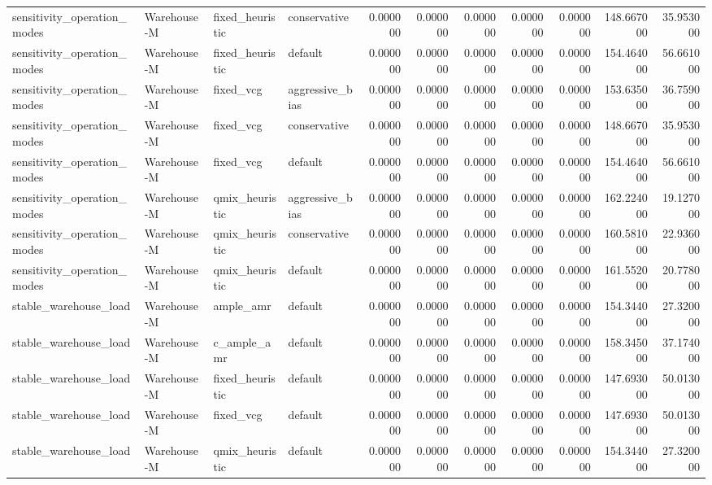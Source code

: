 \begin{tabular}{llllrrrrrrr}
sensitivity_operation_modes & Warehouse-M & fixed_heuristic & conservative & 0.000000 & 0.000000 & 0.000000 & 0.000000 & 0.000000 & 148.667000 & 35.953000 \\
sensitivity_operation_modes & Warehouse-M & fixed_heuristic & default & 0.000000 & 0.000000 & 0.000000 & 0.000000 & 0.000000 & 154.464000 & 56.661000 \\
sensitivity_operation_modes & Warehouse-M & fixed_vcg & aggressive_bias & 0.000000 & 0.000000 & 0.000000 & 0.000000 & 0.000000 & 153.635000 & 36.759000 \\
sensitivity_operation_modes & Warehouse-M & fixed_vcg & conservative & 0.000000 & 0.000000 & 0.000000 & 0.000000 & 0.000000 & 148.667000 & 35.953000 \\
sensitivity_operation_modes & Warehouse-M & fixed_vcg & default & 0.000000 & 0.000000 & 0.000000 & 0.000000 & 0.000000 & 154.464000 & 56.661000 \\
sensitivity_operation_modes & Warehouse-M & qmix_heuristic & aggressive_bias & 0.000000 & 0.000000 & 0.000000 & 0.000000 & 0.000000 & 162.224000 & 19.127000 \\
sensitivity_operation_modes & Warehouse-M & qmix_heuristic & conservative & 0.000000 & 0.000000 & 0.000000 & 0.000000 & 0.000000 & 160.581000 & 22.936000 \\
sensitivity_operation_modes & Warehouse-M & qmix_heuristic & default & 0.000000 & 0.000000 & 0.000000 & 0.000000 & 0.000000 & 161.552000 & 20.778000 \\
stable_warehouse_load & Warehouse-M & ample_amr & default & 0.000000 & 0.000000 & 0.000000 & 0.000000 & 0.000000 & 154.344000 & 27.320000 \\
stable_warehouse_load & Warehouse-M & c_ample_amr & default & 0.000000 & 0.000000 & 0.000000 & 0.000000 & 0.000000 & 158.345000 & 37.174000 \\
stable_warehouse_load & Warehouse-M & fixed_heuristic & default & 0.000000 & 0.000000 & 0.000000 & 0.000000 & 0.000000 & 147.693000 & 50.013000 \\
stable_warehouse_load & Warehouse-M & fixed_vcg & default & 0.000000 & 0.000000 & 0.000000 & 0.000000 & 0.000000 & 147.693000 & 50.013000 \\
stable_warehouse_load & Warehouse-M & qmix_heuristic & default & 0.000000 & 0.000000 & 0.000000 & 0.000000 & 0.000000 & 154.344000 & 27.320000 \\
\bottomrule
\end{tabular}

